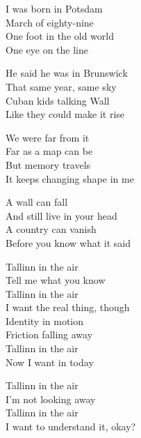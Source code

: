 \begin{lyrics}
I was born in Potsdam\\
March of eighty-nine\\
One foot in the old world\\
One eye on the line

He said he was in Brunswick\\
That same year, same sky\\
Cuban kids talking Wall\\
Like they could make it rise

We were far from it\\
Far as a map can be\\
But memory travels\\
It keeps changing shape in me

A wall can fall\\
And still live in your head\\
A country can vanish\\
Before you know what it said

Tallinn in the air\\
Tell me what you know\\
Tallinn in the air\\
I want the real thing, though\\
Identity in motion\\
Friction falling away\\
Tallinn in the air\\
Now I want in today

Tallinn in the air\\
I’m not looking away\\
Tallinn in the air\\
I want to understand it, okay?
\end{lyrics}

